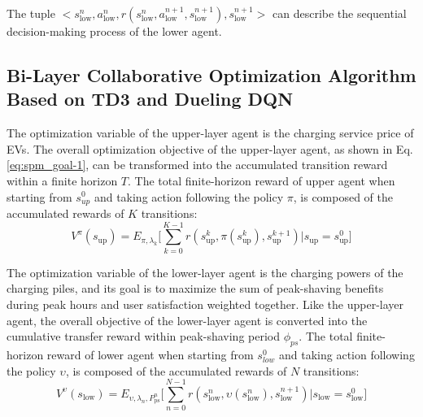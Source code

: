 \documentclass[preprint,12pt]{elsarticle}
\begin{document}
The tuple $<s_{\textrm{low}}^{n},a_{\textrm{low}}^{n},r(s_{\textrm{low}}^{n},a_{\textrm{low}}^{n+1},s_{\textrm{low}}^{n+1}),s_{\textrm{low}}^{n+1}>$ can describe the sequential decision-making process of the lower agent.


\subsection{Bi-Layer Collaborative Optimization Algorithm Based on TD3 and Dueling DQN}

The optimization variable of the upper-layer agent is the charging service price of EVs. The overall optimization objective of the upper-layer agent, as shown in Eq. \ref{eq:spm_goal-1}, can be transformed into
the accumulated transition reward within a finite horizon $T$. The total finite-horizon reward of upper agent when starting from $s_{up}^{0}$ and taking action following the policy $\pi$, is composed of the accumulated rewards of $K$ transitions:
\begin{equation}
V^{\pi}(s_{\textrm{up}})=E_{\pi,\lambda_{k}}\Biggl[\sum_{k=0}^{K-1}r(s_{\textrm{up}}^{k},\pi(s_{\textrm{up}}^{k}),s_{\textrm{up}}^{k+1})\Biggl|s_{\textrm{up}}=s_{\textrm{up}}^{0}\Biggr]\label{eq:up_v(s)}
\end{equation}

The optimization variable of the lower-layer agent is the charging powers of the charging piles, and its goal is to maximize the sum of peak-shaving benefits during peak hours and user satisfaction weighted together. Like the upper-layer agent, the overall objective of the lower-layer agent is converted into the cumulative transfer reward within peak-shaving period $\phi_{ps}$. The total finite-horizon reward of lower agent when starting from $s_{low}^{0}$ and taking action following the policy $\upsilon$, is composed of the accumulated rewards of $N$ transitions:
\begin{equation}
V^{\upsilon}(s_{\textrm{low}})=E_{\upsilon,\lambda_{n},P_{\textrm{ps}}^{n}}\Biggl[\sum_{n=0}^{N-1}r(s_{\textrm{low}}^{n},\upsilon(s_{\textrm{low}}^{n}),s_{\textrm{low}}^{n+1})
\Biggl|s_{\textrm{low}}=s_{\textrm{low}}^{0}\Biggr]
\label{eq:low_V(s)}
\end{equation}
\end{document}
